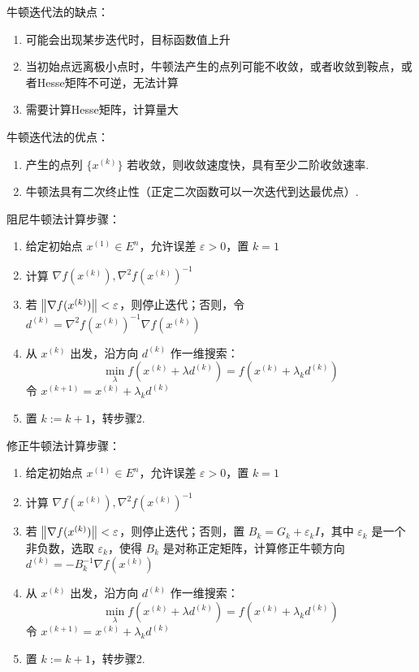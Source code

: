 \begin{remark}
    牛顿迭代法的缺点：\begin{enumerate}
        \item 可能会出现某步迭代时，目标函数值上升
        \item 当初始点远离极小点时，牛顿法产生的点列可能不收敛，或者收敛到鞍点，或者Hesse矩阵不可逆，无法计算
        \item 需要计算Hesse矩阵，计算量大
    \end{enumerate}
    牛顿迭代法的优点：\begin{enumerate}
        \item 产生的点列 $\{x^{(k)}\}$ 若收敛，则收敛速度快，具有至少二阶收敛速率.
        \item 牛顿法具有二次终止性（正定二次函数可以一次迭代到达最优点）.
    \end{enumerate}
\end{remark}

\begin{remark}
    阻尼牛顿法计算步骤：\begin{enumerate}
        \item 给定初始点 $x^{(1)} \in E^n$，允许误差 $\varepsilon > 0$，置 $k = 1$
        \item 计算 $\nabla f(x^{(k)}), \nabla^2f(x^{(k)})^{-1}$
        \item 若 $\norm{\nabla f(x^{(k)})} < \varepsilon$，则停止迭代；否则，令 $d^{(k)} = \nabla^2f(x^{(k)})^{-1}\nabla f(x^{(k)})$
        \item 从 $x^{(k)}$ 出发，沿方向 $d^{(k)}$ 作一维搜索：\[\min_{\lambda} f(x^{(k)} + \lambda d^{(k)}) = f(x^{(k)} + \lambda_k d^{(k)})\] 令 $x^{(k + 1)} = x^{(k)} + \lambda_k d^{(k)}$
        \item 置 $k := k + 1$，转步骤2.
    \end{enumerate}
\end{remark}

\begin{remark}
    修正牛顿法计算步骤：\begin{enumerate}
        \item 给定初始点 $x^{(1)} \in E^n$，允许误差 $\varepsilon > 0$，置 $k = 1$
        \item 计算 $\nabla f(x^{(k)}), \nabla^2f(x^{(k)})^{-1}$
        \item 若 $\norm{\nabla f(x^{(k)})} < \varepsilon$，则停止迭代；否则，置 $B_k = G_k + \varepsilon_k I$，其中 $\varepsilon_k$ 是一个非负数，选取 $\varepsilon_k$，使得 $B_k$ 是对称正定矩阵，计算修正牛顿方向 $d^{(k)} = -B_k^{-1}\nabla f(x^{(k)})$
        \item 从 $x^{(k)}$ 出发，沿方向 $d^{(k)}$ 作一维搜索：\[\min_{\lambda} f(x^{(k)} + \lambda d^{(k)}) = f(x^{(k)} + \lambda_k d^{(k)})\] 令 $x^{(k + 1)} = x^{(k)} + \lambda_k d^{(k)}$
        \item 置 $k := k + 1$，转步骤2.
    \end{enumerate}
\end{remark}

